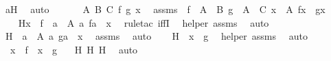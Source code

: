 \begin{isabellebody}
\ aH\ \isamarkupfalse%
\ auto\isanewline
\ \ \isamarkupfalse%
\isanewline
\isanewline
\ \ \isamarkupfalse%
\ A\ B\ C\ f\ g\ x\ \isamarkupfalse%
\ assms\ {\isacharcolon}{\kern0pt}\ {\isachardoublequoteopen}f\ {\isasymin}\ A\ {\isasymrightarrow}\ B{\isachardoublequoteclose}\ {\isachardoublequoteopen}g\ {\isasymin}\ A\ {\isasymrightarrow}\ C{\isachardoublequoteclose}\ {\isachardoublequoteopen}{\isasymforall}x\ {\isasymin}\ A{\isachardot}{\kern0pt}\ f{\isacharbackquote}{\kern0pt}x\ {\isacharequal}{\kern0pt}\ g{\isacharbackquote}{\kern0pt}x{\isachardoublequoteclose}\ \ \isanewline
\ \ \isamarkupfalse%
\ H{}{\isacharcolon}{\kern0pt}{\isachardoublequoteopen}x\ {\isasymin}\ f\ {\isasymlongleftrightarrow}\ {\isacharparenleft}{\kern0pt}{\isasymexists}a\ {\isasymin}\ A{\isachardot}{\kern0pt}\ {\isacharless}{\kern0pt}a{\isacharcomma}{\kern0pt}\ f{\isacharbackquote}{\kern0pt}a{\isachargreater}{\kern0pt}\ {\isacharequal}{\kern0pt}\ x{\isacharparenright}{\kern0pt}{\isachardoublequoteclose}\ \isamarkupfalse%
\ {\isacharparenleft}{\kern0pt}rule{\isacharunderscore}{\kern0pt}tac\ iffI{\isacharparenright}{\kern0pt}\ \isamarkupfalse%
\ helper\ assms\ \isamarkupfalse%
\ auto\ \isanewline
\ \ \isamarkupfalse%
\ H{}{\isacharcolon}{\kern0pt}{\isachardoublequoteopen}{\isachardot}{\kern0pt}{\isachardot}{\kern0pt}{\isachardot}{\kern0pt}\ {\isasymlongleftrightarrow}\ {\isacharparenleft}{\kern0pt}{\isasymexists}a\ {\isasymin}\ A{\isachardot}{\kern0pt}\ {\isacharless}{\kern0pt}a{\isacharcomma}{\kern0pt}\ g{\isacharbackquote}{\kern0pt}a{\isachargreater}{\kern0pt}\ {\isacharequal}{\kern0pt}\ x{\isacharparenright}{\kern0pt}{\isachardoublequoteclose}\ \isamarkupfalse%
\ assms\ \isamarkupfalse%
\ auto\isanewline
\ \ \isamarkupfalse%
\ H{}{\isacharcolon}{\kern0pt}{\isachardoublequoteopen}{\isachardot}{\kern0pt}{\isachardot}{\kern0pt}{\isachardot}{\kern0pt}\ {\isasymlongleftrightarrow}\ x\ {\isasymin}\ g{\isachardoublequoteclose}\ \isamarkupfalse%
\ helper\ assms\ \isamarkupfalse%
\ auto\ \isanewline
\ \ \isamarkupfalse%
\ {\isachardoublequoteopen}\ x\ {\isasymin}\ f\ {\isasymlongleftrightarrow}\ x\ {\isasymin}\ g\ {\isachardoublequoteclose}\ \isamarkupfalse%
\ H{}\ H{}\ H{}\ \isamarkupfalse%
\ auto\ \isanewline
{}\isamarkupfalse%

\end{isabellebody}
